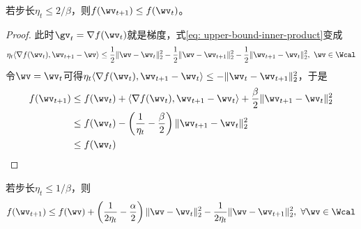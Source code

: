 \documentclass{ctexart}
\begin{document}
\begin{lemma} [单调性]
    若步长$\eta_t \le 2 / \beta$，则$f(\wv_{t+1}) \le f(\wv_t)$。
\end{lemma}

\begin{proof}
    此时$\gv_t = \nabla f(\wv_t)$就是梯度，式\eqref{eq: upper-bound-inner-product}变成
    \begin{align} \label{eq: upper-bound-inner-product-smooth}
        \eta_t \langle \nabla f(\wv_t), \wv_{t+1} - \wv \rangle \le \frac{1}{2} \| \wv - \wv_t \|_2^2 - \frac{1}{2} \| \wv - \wv_{t+1} \|_2^2 - \frac{1}{2} \| \wv_{t+1} - \wv_t \|_2^2, ~ \wv \in \Wcal
    \end{align}
    令$\wv = \wv_t$可得$\eta_t \langle \nabla f(\wv_t), \wv_{t+1} - \wv_t \rangle \le - \| \wv_t - \wv_{t+1} \|_2^2$，于是
    \begin{align*}
        f(\wv_{t+1}) & \le f(\wv_t) + \langle \nabla f(\wv_t), \wv_{t+1} - \wv_t \rangle + \frac{\beta}{2} \| \wv_{t+1} - \wv_t \|_2^2 \\
                     & \le f(\wv_t) - \left( \frac{1}{\eta_t} - \frac{\beta}{2} \right) \| \wv_{t+1} - \wv_t \|_2^2                    \\
                     & \le f(\wv_t)
    \end{align*}
\end{proof}

\begin{lemma}
    若步长$\eta_t \le 1 / \beta$，则
    \begin{align}  \label{eq: one-step-smooth-convex}
        f(\wv_{t+1}) \le f(\wv) + \left( \frac{1}{2\eta_t} - \frac{\alpha}{2} \right) \| \wv - \wv_t \|_2^2 - \frac{1}{2\eta_t} \| \wv - \wv_{t+1} \|_2^2, ~ \forall \wv \in \Wcal
    \end{align}
\end{lemma}
\end{document}
